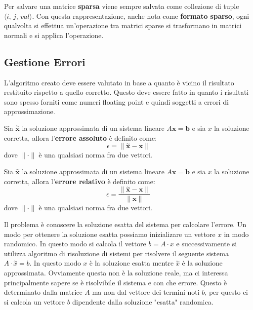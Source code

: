 Per salvare una matrice \textbf{sparsa} viene sempre salvata come collezione di
tuple $\langle i, \, j,\, val\rangle$. Con questa rappresentazione, anche nota
come \textbf{formato sparso}, ogni qualvolta si effettua un'operazione tra matrici
sparse si trasformano in matrici normali e si applica l'operazione.
\subsection{Gestione Errori}
L'algoritmo creato deve essere valutato in base a quanto è vicino il risultato
restituito rispetto a quello corretto. Questo deve essere fatto in quanto
i risultati sono spesso forniti come numeri floating point e quindi soggetti
a errori di approssimazione.

\begin{definizione}
    Sia $\stackrel{\sim}{\textbf{x}}$ la soluzione approssimata di un sistema
    lineare $A\textbf{x} = \textbf{b}$ e sia $x$ la soluzione corretta, allora
    l'\textbf{errore assoluto} è definito come:
    \begin{equation}
        \epsilon = \|\stackrel{\sim}{\textbf{x}} - \textbf{x}\|
    \end{equation}
    dove $\|\cdot\|$ è una qualsiasi norma fra due vettori.
\end{definizione}
\begin{definizione}
    Sia $\stackrel{\sim}{\textbf{x}}$ la soluzione approssimata di un sistema
    lineare $A\textbf{x} = \textbf{b}$ e sia $x$ la soluzione corretta, allora
    l'\textbf{errore relativo} è definito come:
    \begin{equation}
        \epsilon = \frac{\|\stackrel{\sim}{\textbf{x}} - \textbf{x}\|}{\|\textbf{x}\|}
    \end{equation}
    dove $\|\cdot\|$ è una qualsiasi norma fra due vettori.
\end{definizione}

Il problema è conoscere la soluzione esatta del sistema per calcolare l'errore.
Un modo per ottenere la soluzione esatta possiamo inizializare un vettore $x$ in modo
randomico. In questo modo si calcola il vettore $b =A\cdot x $ e successivamente
si utilizza algoritmo di risoluzione di sistemi per risolvere il seguente
sistema $A\cdot \stackrel{\sim}{x} = b$. In questo modo $x$ è la soluzione esatta
mentre  $\stackrel{\sim}{x}$ è la soluzione approssimata. Ovviamente questa non è
la soluzione reale, ma ci interessa principalmente sapere se è risolvibile il sistema
e con che errore. Questo è determinato dalla matrice $A$ ma non dal vettore dei
termini noti $b$, per questo ci si calcola un vettore $b$ dipendente dalla soluzione
"esatta" randomica.

